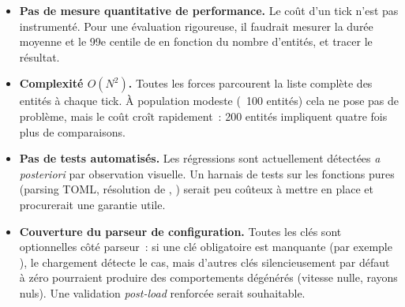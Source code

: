 \begin{itemize}
  \item \textbf{Pas de mesure quantitative de performance.} Le
    coût d'un tick n'est pas instrumenté. Pour une évaluation
    rigoureuse, il faudrait mesurer la durée moyenne et le 99e
    centile de  en fonction du nombre
    d'entités, et tracer le résultat.

  \item \textbf{Complexité $O(N^2)$.} Toutes les forces
    parcourent la liste complète des entités à chaque tick. À
    population modeste (~100 entités) cela ne pose pas de
    problème, mais le coût croît rapidement~: 200 entités
    impliquent quatre fois plus de comparaisons.

  \item \textbf{Pas de tests automatisés.} Les régressions sont
    actuellement détectées \emph{a posteriori} par observation
    visuelle. Un harnais de tests sur les fonctions pures
    (parsing TOML, résolution de ,
    ) serait peu coûteux à mettre en place et
    procurerait une garantie utile.

  \item \textbf{Couverture du parseur de configuration.} Toutes
    les clés sont optionnelles côté parseur~: si une clé
    obligatoire est manquante (par exemple ), le
    chargement détecte le cas, mais d'autres clés silencieusement
    par défaut à zéro pourraient produire des comportements
    dégénérés (vitesse nulle, rayons nuls). Une validation
    \emph{post-load} renforcée serait souhaitable.
\end{itemize}
